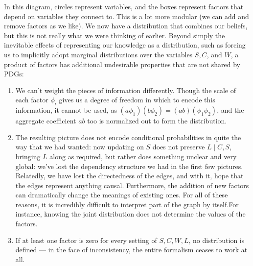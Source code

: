 \documentclass{article}
\newcommand\changed[1]{{\color{note-fg} #1}}
\newcommand{\MNs}{PDGs}
\begin{document}
\begin{example}[continues=ex:planet]
\begin{center}
		\end{center}
	 	\changed{In this diagram, circles represent variables, and the boxes represent factors that depend on variables they connect to.}
		This is a lot more modular (we can add and remove factors as we like). We now have a distribution that combines our beliefs, but this is not really what we were thinking of earlier. Beyond simply the inevitable effects \changed{of representing our knowledge as a distribution, such as forcing us to implicitly adopt marginal distributions over the variables $S,C$, and $W$, a product of factors has additional undesirable properties that are not shared by \MNs:}

		\begin{enumerate}
			\item We can't weight the pieces of information differently. Though the scale of each factor $\phi_i$ gives us a degree of freedom in which to encode this information, it cannot be used, as $(a\phi_1) (b\phi_2) = (ab) (\phi_1\phi_2)$, and the aggregate coefficient $ab$ too is normalized out to form the distribution.
			
			\item The resulting picture does not encode conditional probabilities in quite the way that we had wanted: now updating on $S$ does not preserve $L\mid C,S$, bringing $L$ along as required, but rather does something unclear and very global: we've lost the dependency structure we had in the first few pictures. Relatedly, we have lost the directedness of the edges, and with it, hope that the edges represent anything causal. Furthermore, the addition of new factors can dramatically change the meanings of existing ones. For all of these reasons, it is incredibly difficult to interpret part of the graph by itself.For instance, knowing the joint distribution does not determine the values of the factors.
			
			\item If at least one factor is zero for every setting of $S,C,W,L$, no distribution is defined --- in the face of inconsistency, the entire formalism ceases to work at all.
		\end{enumerate}		
	\end{example}
	
\end{document}
